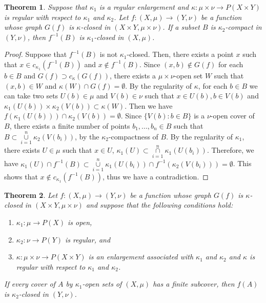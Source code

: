 \documentclass{matua}
\newtheorem{theorem}{Theorem}[section]
\begin{document}
\begin{theorem}\label{t5.5}
Suppose that $\kappa_1$ is a regular enlargement and $\kappa:\mu\times \nu\rightarrow P(X\times Y)$ is regular with respect to $\kappa_1$ and $\kappa_2$. Let $f:(X, \mu)\rightarrow (Y, \nu)$ be a function whose graph $G(f)$ is $\kappa$-closed in  $(X\times Y, \mu\times \nu)$. If a subset $B$ is $\kappa_2$-compact in $(Y, \nu)$, then $f^{-1}(B)$ is $\kappa_1$-closed in $(X, \mu)$.
\end{theorem}
\begin{proof}
Suppose that $f^{-1}(B)$ is not $\kappa_1$-closed. Then, there exists a point $x$ such that $x\in c_{\kappa_1}(f^{-1}(B))$ and $x\notin f^{-1}(B)$. Since $(x, b)\notin G(f)$ for each $b\in B$ and $G(f)\supset c_{\kappa}(G(f))$, there exists a $\mu\times \nu$-open set $W$ such that $(x, b)\in W$ and $\kappa(W)\cap G(f) = \emptyset$. By the regularity of $\kappa$, for each $b\in B$ we can take two sets $U(b)\in \mu$ and $V(b)\in\nu$ such that $x\in U(b), b\in V(b)$ and $\kappa_1(U(b))\times \kappa_2(V(b))\subset\kappa(W)$. Then we have $f(\kappa_1(U(b)))\cap \kappa_2(V(b)) = \emptyset$. Since $\{V(b): b\in B\}$ is a $\nu$-open cover of $B$, there exists a finite number of points $b_1,...,b_n\in B$ such that $B\subset \mathop\cup\limits_{i=1}^{n}\kappa_2(V(b_i))$, by the $\kappa_2$-compactness of $B$. By the regularity of $\kappa_1$, there exists $U\in \mu$ such that $x\in U$, $\kappa_1(U)\subset \mathop\cap\limits_{i=1}^{n}\kappa_1(U(b_i))$. Therefore, we have $\kappa_1(U)\cap f^{-1}(B)\subset \mathop\cup\limits_{i=1}^{n}\kappa_1(U(b_i))\cap f^{-1}(\kappa_2(V(b_i)))=\emptyset$. This shows that $x\notin c_{\kappa_1}(f^{-1}(B))$, thus we have a contradiction.
\end{proof}
\begin{theorem}
Let $f:(X, \mu)\rightarrow (Y, \nu)$ be a function whose graph $G(f)$ is $\kappa$-closed in $(X\times Y, \mu\times \nu)$ and
suppose that the following conditions hold:
\begin{enumerate}
\item $\kappa_1:\mu\rightarrow P(X)$ is open,
\item $\kappa_2:\nu\rightarrow P(Y)$ is regular, and
\item $\kappa:\mu\times \nu\rightarrow P(X\times Y)$ is an enlargement associated with $\kappa_1$ and $\kappa_2$ and $\kappa$ is regular with respect to $\kappa_1$ and $\kappa_2$.
\end{enumerate}
 If every cover of $A$ by $\kappa_1$-open sets of $(X, \mu)$ has a finite subcover, then $f(A)$ is $\kappa_2$-closed in $(Y, \nu)$.
\end{theorem}
\end{document}
